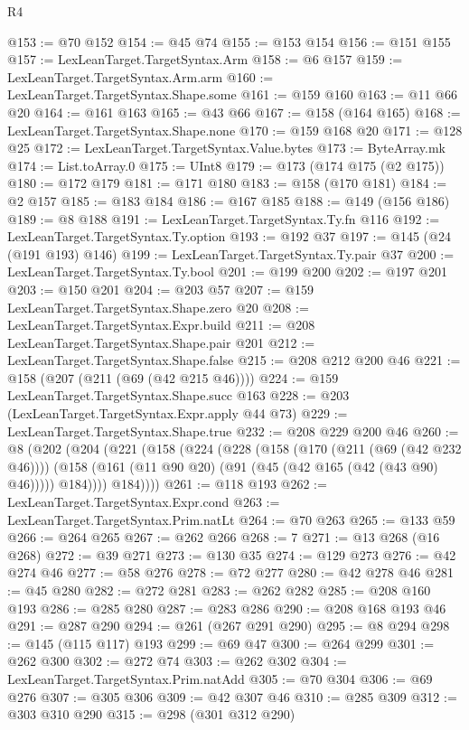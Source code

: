 \begin{lexlean}{R4}
\begin{coremodule}
@153 := @70 @152
@154 := @45 @74
@155 := @153 @154
@156 := @151 @155
@157 := LexLeanTarget.TargetSyntax.Arm
@158 := @6 @157
@159 := LexLeanTarget.TargetSyntax.Arm.arm
@160 := LexLeanTarget.TargetSyntax.Shape.some
@161 := @159 @160
@163 := @11 @66 @20
@164 := @161 @163
@165 := @43 @66
@167 := @158 (@164 @165)
@168 := LexLeanTarget.TargetSyntax.Shape.none
@170 := @159 @168 @20
@171 := @128 @25
@172 := LexLeanTarget.TargetSyntax.Value.bytes
@173 := ByteArray.mk
@174 := List.toArray.{0}
@175 := UInt8
@179 := @173 (@174 @175 (@2 @175))
@180 := @172 @179
@181 := @171 @180
@183 := @158 (@170 @181)
@184 := @2 @157
@185 := @183 @184
@186 := @167 @185
@188 := @149 (@156 @186)
@189 := @8 @188
@191 := LexLeanTarget.TargetSyntax.Ty.fn @116
@192 := LexLeanTarget.TargetSyntax.Ty.option
@193 := @192 @37
@197 := @145 (@24 (@191 @193) @146)
@199 := LexLeanTarget.TargetSyntax.Ty.pair @37
@200 := LexLeanTarget.TargetSyntax.Ty.bool
@201 := @199 @200
@202 := @197 @201
@203 := @150 @201
@204 := @203 @57
@207 := @159 LexLeanTarget.TargetSyntax.Shape.zero @20
@208 := LexLeanTarget.TargetSyntax.Expr.build
@211 := @208 LexLeanTarget.TargetSyntax.Shape.pair @201
@212 := LexLeanTarget.TargetSyntax.Shape.false
@215 := @208 @212 @200 @46
@221 := @158 (@207 (@211 (@69 (@42 @215 @46))))
@224 := @159 LexLeanTarget.TargetSyntax.Shape.succ @163
@228 := @203 (LexLeanTarget.TargetSyntax.Expr.apply @44 @73)
@229 := LexLeanTarget.TargetSyntax.Shape.true
@232 := @208 @229 @200 @46
@260 := @8
    (@202
      (@204
        (@221
          (@158
            (@224
              (@228
                (@158
                  (@170 (@211 (@69 (@42 @232 @46))))
                  (@158 (@161 (@11 @90 @20) (@91 (@45 (@42 @165 (@42 (@43 @90) @46))))) @184))))
            @184))))
@261 := @118 @193
@262 := LexLeanTarget.TargetSyntax.Expr.cond
@263 := LexLeanTarget.TargetSyntax.Prim.natLt
@264 := @70 @263
@265 := @133 @59
@266 := @264 @265
@267 := @262 @266
@268 := 7
@271 := @13 @268 (@16 @268)
@272 := @39 @271
@273 := @130 @35
@274 := @129 @273
@276 := @42 @274 @46
@277 := @58 @276
@278 := @72 @277
@280 := @42 @278 @46
@281 := @45 @280
@282 := @272 @281
@283 := @262 @282
@285 := @208 @160 @193
@286 := @285 @280
@287 := @283 @286
@290 := @208 @168 @193 @46
@291 := @287 @290
@294 := @261 (@267 @291 @290)
@295 := @8 @294
@298 := @145 (@115 @117) @193
@299 := @69 @47
@300 := @264 @299
@301 := @262 @300
@302 := @272 @74
@303 := @262 @302
@304 := LexLeanTarget.TargetSyntax.Prim.natAdd
@305 := @70 @304
@306 := @69 @276
@307 := @305 @306
@309 := @42 @307 @46
@310 := @285 @309
@312 := @303 @310 @290
@315 := @298 (@301 @312 @290)

\end{coremodule}
\end{lexlean}
